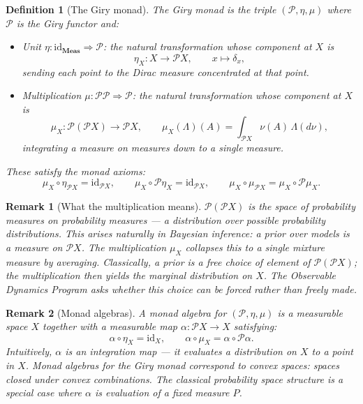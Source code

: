 \documentclass[11pt]{article}
\newtheorem{definition}{Definition}
\newtheorem{remark}{Remark}
\newcommand{\Meas}{\mathbf{Meas}}
\newcommand{\Pcal}{\mathcal{P}}
\newcommand{\id}{\mathrm{id}}
\begin{document}
\begin{definition}[The Giry monad]\label{def:giry-monad}
The \emph{Giry monad} is the triple $(\Pcal, \eta, \mu)$ where $\Pcal$ is the
Giry functor and:
\begin{itemize}
  \item \emph{Unit} $\eta : \id_{\Meas} \Rightarrow \Pcal$: the natural
    transformation whose component at $X$ is
    \[
      \eta_X : X \to \Pcal X, \qquad x \mapsto \delta_x,
    \]
    sending each point to the Dirac measure concentrated at that point.
  \item \emph{Multiplication} $\mu : \Pcal\Pcal \Rightarrow \Pcal$: the
    natural transformation whose component at $X$ is
    \[
      \mu_X : \Pcal(\Pcal X) \to \Pcal X,
      \qquad
      \mu_X(\Lambda)(A) = \int_{\Pcal X} \nu(A)\, \Lambda(d\nu),
    \]
    integrating a measure on measures down to a single measure.
\end{itemize}
These satisfy the monad axioms:
\[
  \mu_X \circ \eta_{\Pcal X} = \id_{\Pcal X}, \qquad
  \mu_X \circ \Pcal\eta_X = \id_{\Pcal X}, \qquad
  \mu_X \circ \mu_{\Pcal X} = \mu_X \circ \Pcal\mu_X.
\]
\end{definition}

\begin{remark}[What the multiplication means]
$\Pcal(\Pcal X)$ is the space of \emph{probability measures on probability
measures} --- a distribution over possible probability distributions.  This
arises naturally in Bayesian inference: a prior over models is a measure on
$\Pcal X$.  The multiplication $\mu_X$ collapses this to a single \emph{mixture
measure} by averaging.  Classically, a prior is a free choice of element of
$\Pcal(\Pcal X)$; the multiplication then yields the marginal distribution
on $X$.  The Observable Dynamics Program asks whether this choice can be
forced rather than freely made.
\end{remark}

\begin{remark}[Monad algebras]
A \emph{monad algebra} for $(\Pcal, \eta, \mu)$ is a measurable space $X$
together with a measurable map $\alpha : \Pcal X \to X$ satisfying:
\[
  \alpha \circ \eta_X = \id_X, \qquad \alpha \circ \mu_X = \alpha \circ \Pcal\alpha.
\]
Intuitively, $\alpha$ is an \emph{integration map} --- it evaluates a
distribution on $X$ to a point in $X$.  Monad algebras for the Giry monad
correspond to \emph{convex spaces}: spaces closed under convex combinations.
The classical probability space structure is a special case where $\alpha$
is evaluation of a fixed measure $P$.
\end{remark}
\end{document}
